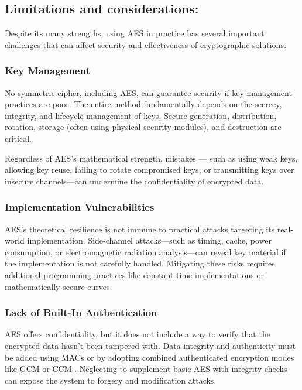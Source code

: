 \subsection{Limitations and considerations:}

Despite its many strengths, using AES in practice has several important challenges that can affect security 
and effectiveness of cryptographic solutions.

\subsubsection*{Key Management}

No symmetric cipher, including AES, can guarantee security if key management practices are poor. The entire 
method fundamentally depends on the secrecy, integrity, and lifecycle management of keys. Secure generation, 
distribution, rotation, storage (often using physical security modules), and destruction are critical.

Regardless of AES's mathematical strength, mistakes — such as using weak keys, allowing key reuse, failing to 
rotate compromised keys, or transmitting keys over insecure channels—can undermine the confidentiality of 
encrypted data.

\subsubsection*{Implementation Vulnerabilities}

AES's theoretical resilience is not immune to practical attacks targeting its real-world implementation. 
Side-channel attacks—such as timing, cache, power consumption, or electromagnetic radiation analysis—can 
reveal key material if the implementation is not carefully handled. Mitigating these risks requires additional 
programming practices like constant-time implementations or mathematically secure curves.

\subsubsection*{Lack of Built-In Authentication}
AES offers confidentiality, but it does not include a way to verify that the encrypted data hasn't been tampered 
with. Data integrity and authenticity must be added using \Glspl{MAC} or by adopting combined authenticated encryption 
modes like \Gls{GCM} or \Gls{CCM} \cite{rfc4494}. Neglecting to supplement basic AES with integrity checks can expose the system to forgery 
and modification attacks.